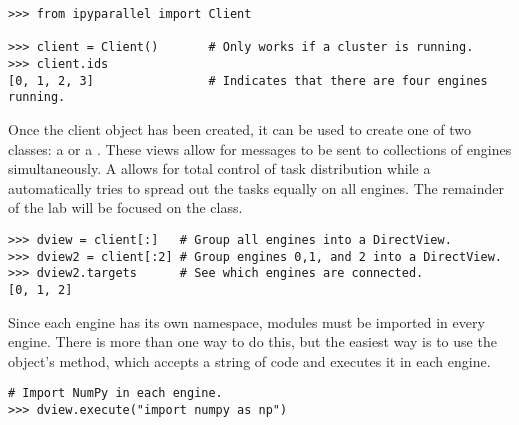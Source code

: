 \begin{lstlisting}
>>> from ipyparallel import Client

>>> client = Client()       # Only works if a cluster is running.
>>> client.ids
[0, 1, 2, 3]                # Indicates that there are four engines running.
\end{lstlisting}

Once the client object has been created, it can be used to create one of two classes: a  or a .
These views allow for messages to be sent to collections of engines simultaneously.
A  allows for total control of task distribution while a  automatically tries to spread out the tasks equally on all engines.
The remainder of the lab will be focused on the  class.

\begin{lstlisting}
>>> dview = client[:]   # Group all engines into a DirectView.
>>> dview2 = client[:2] # Group engines 0,1, and 2 into a DirectView.
>>> dview2.targets      # See which engines are connected.
[0, 1, 2]
\end{lstlisting}

\begin{comment} %
There is also a \li{targets} object which can be set as a \li{DirectView} variable or as a parameter in functions.
It allows for a subgroup of the \li{DirectView} to be specified for subsequent actions.
It is accessed as follows.

\begin{lstlisting}
# Target only engines 0 and 2 until changed.
>>> dview.targets = [0,2]
# To revert to all engines,
>>> dview.targets = None
\end{lstlisting}
\end{comment}

Since each engine has its own namespace, modules must be imported in every engine.
There is more than one way to do this, but the easiest way is to use the  object's  method, which accepts a string of code and executes it in each engine.


\begin{lstlisting}
# Import NumPy in each engine.
>>> dview.execute("import numpy as np")
\end{lstlisting}

